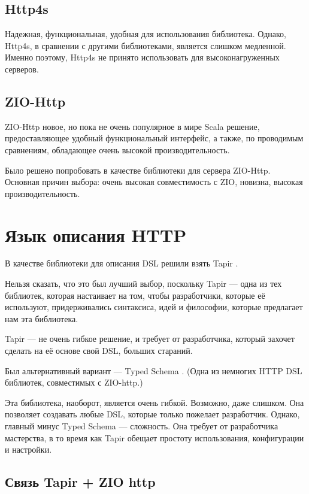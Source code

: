 \documentclass[14pt]{extarticle}
\begin{document}
    \subsection{Http4s}
    Надежная, функциональная, удобная для использования библиотека. Однако, Http4s, в сравнении с другими библиотеками,
    является слишком медленной. Именно поэтому, Http4s не принято использовать для высоконагруженных серверов.
    
    \subsection{ZIO-Http}

    ZIO-Http новое, но пока не очень популярное в мире Scala решение,
    предоставляющее удобный
    функциональный
    интерфейс, а
    также, по проводимым сравнениям, обладающее очень высокой производительность.

    Было решено попробовать в качестве библиотеки для сервера ZIO-Http. Основная причин выбора: очень высокая
    совместимость с ZIO, новизна, высокая производительность.


    \section{Язык описания HTTP}

    В качестве библиотеки для описания DSL решили взять Tapir \cite{tapir}.

    Нельзя сказать, что это был лучший выбор, поскольку Tapir --- одна из тех библиотек, которая настаивает на том,
    чтобы разработчики, которые её используют, придерживались синтаксиса, идей и философии, которые предлагает нам
    эта библиотека.

    Tapir --- не очень гибкое решение, и требует от разработчика, который захочет сделать на её основе свой DSL, больших
    стараний.

    Был альтернативный вариант --- Typed Schema \cite{ts}. (Одна из немногих HTTP DSL библиотек, совместимых с ZIO-http.)

    Эта библиотека, наоборот, является очень гибкой. Возможно, даже слишком. Она позволяет создавать любые DSL,
    которые только пожелает разработчик. Однако, главный минус Typed Schema --- сложность. Она требует от разработчика
    мастерства, в то время как Tapir обещает простоту использования, конфигурации и настройки.

    \newpage
    \subsection{Связь Tapir + ZIO http}
\end{document}
